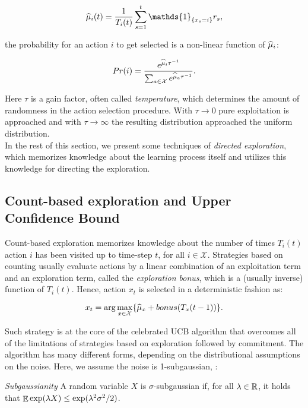 \begin{equation}
\wh{\mu}_i(t) = \frac{1}{T_i(t)}\sum_{s=1}^{t}\mathds{1}_{\{x_s=i\}}r_s,
\end{equation}

the probability for an action $i$ to get selected is a non-linear function of $\widehat{\mu}_i$:

\begin{equation}
Pr(i) = \frac{e^{\widehat{\mu}_i \tau^{-1}}}{\sum_{a\in\mathcal{X}}e^{\widehat{\mu}_{a}\tau^{-1}}}.
\end{equation}

Here $\tau$ is a gain factor, often called \emph{temperature}, which determines the amount of randomness in the action selection procedure. With $\tau\to 0$ pure exploitation is approached and with $\tau\to \infty$ the resulting distribution approached the uniform distribution. \\
In the rest of this section, we present some techniques of \emph{directed exploration}, which memorizes knowledge about the learning process itself and utilizes this knowledge for directing the exploration.

\subsection{Count-based exploration and Upper Confidence Bound} \label{count&UCB}
Count-based exploration memorizes knowledge about the number of times $T_i(t)$ action $i$ has been visited up to time-step $t$, for all $i\in\mathcal{X}$. Strategies based on counting usually evaluate actions by a linear combination of an exploitation term and an exploration term, called the \emph{exploration bonus}, which is a (usually inverse) function of $T_i(t)$. Hence, action $x_t$ is selected in a deterministic fashion as:

\begin{equation}
x_t = \arg\max_{x\in\mathcal{X}}\{\widehat{\mu}_x + bonus(T_x(t-1))\}.
\end{equation}

Such strategy is at the core of the celebrated \gls{UCB} algorithm \cite{lai1985asymptotically, agrawal1995continuum, auer2002finite} that overcomes all of the limitations of strategies based on exploration followed by commitment. The algorithm has many different forms, depending on the distributional assumptions on the noise. Here, we assume the noise is 1-subgaussian, \ie :

\begin{definition} \label{def:subgaussianity}
\emph{Subgaussianity} A random variable $X$ is $\sigma$-subgaussian if, for all $\lambda\in\mathbb{R}$, it holds that $\mathop{\mathbb{E}}{\exp(\lambda X})\leq\exp(\lambda^2\sigma^2/2)$.
\end{definition}

